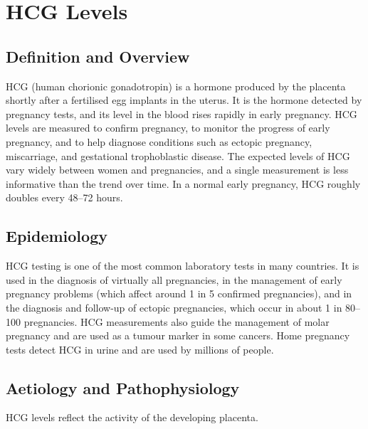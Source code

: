 \chapter{HCG Levels}

\section*{Definition and Overview}
HCG (human chorionic gonadotropin) is a hormone produced by the placenta shortly after a fertilised egg implants in the uterus. It is the hormone detected by pregnancy tests, and its level in the blood rises rapidly in early pregnancy. HCG levels are measured to confirm pregnancy, to monitor the progress of early pregnancy, and to help diagnose conditions such as ectopic pregnancy, miscarriage, and gestational trophoblastic disease. The expected levels of HCG vary widely between women and pregnancies, and a single measurement is less informative than the trend over time. In a normal early pregnancy, HCG roughly doubles every 48--72 hours.

\section*{Epidemiology}
HCG testing is one of the most common laboratory tests in many countries. It is used in the diagnosis of virtually all pregnancies, in the management of early pregnancy problems (which affect around 1 in 5 confirmed pregnancies), and in the diagnosis and follow-up of ectopic pregnancies, which occur in about 1 in 80--100 pregnancies. HCG measurements also guide the management of molar pregnancy and are used as a tumour marker in some cancers. Home pregnancy tests detect HCG in urine and are used by millions of people.

\section*{Aetiology and Pathophysiology}
HCG levels reflect the activity of the developing placenta.

